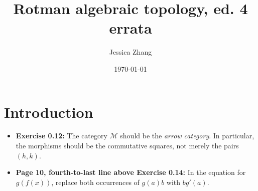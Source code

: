 \documentclass{article}
\title{Rotman algebraic topology, ed. 4 errata}
\author{Jessica Zhang}
\date{\today}
\newcommand*\loc[1]{\textbf{#1:}}
\begin{document}
\maketitle

\section{Introduction} 
\begin{itemize} 
\item \loc{Exercise 0.12} 
The category $\mathcal M$ should be the \emph{arrow category}. In particular, the morphisms should be the commutative squares, not merely the pairs $(h,k)$. 

\item \loc{Page 10, fourth-to-last line above Exercise 0.14} 
In the equation for $g(f(x))$, replace both occurrences of $g(a)b$ with $bg'(a)$. 
\end{itemize} 
\end{document}
